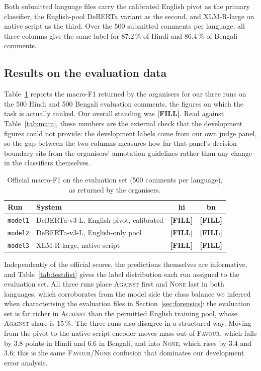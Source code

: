 \documentclass{ceurart}
\newcommand{\fillme}{\textbf{[FILL]}}
\newcommand{\offOneHi}{\fillme}   %
\newcommand{\offOneBn}{\fillme}   %
\newcommand{\offTwoHi}{\fillme}   %
\newcommand{\offTwoBn}{\fillme}   %
\newcommand{\offThreeHi}{\fillme} %
\newcommand{\offThreeBn}{\fillme} %
\newcommand{\offRank}{\fillme}
\begin{document}
Both submitted language files carry the calibrated English pivot as the
primary classifier, the English-pool DeBERTa variant as the second, and
XLM-R-large on native script as the third. Over the 500 submitted comments
per language, all three columns give the same label for $87.2\,\%$ of Hindi
and $86.4\,\%$ of Bengali comments.

\subsection{Results on the evaluation data}
\label{sec:official}

Table~\ref{tab:official} reports the macro-F1 returned by the organisers for
our three runs on the 500 Hindi and 500 Bengali evaluation comments, the
figures on which the task is actually ranked. Our overall standing was
\offRank. Read against Table~\ref{tab:main}, these numbers are the external
check that the development figures could not provide: the development labels
come from our own judge panel, so the gap between the two columns measures how
far that panel's decision boundary sits from the organisers' annotation
guidelines rather than any change in the classifiers themselves.

\begin{table}[t]
\centering
\caption{Official macro-F1 on the evaluation set (500 comments per language),
as returned by the organisers.}
\label{tab:official}
\begin{tabular}{llcc}
\toprule
Run & System & hi & bn \\
\midrule
\texttt{model1} & DeBERTa-v3-L, English pivot, calibrated & \offOneHi  & \offOneBn \\
\texttt{model2} & DeBERTa-v3-L, English-only pool         & \offTwoHi  & \offTwoBn \\
\texttt{model3} & XLM-R-large, native script              & \offThreeHi & \offThreeBn \\
\bottomrule
\end{tabular}
\end{table}

Independently of the official scores, the predictions themselves are
informative, and Table~\ref{tab:testdist} gives the label distribution each
run assigned to the evaluation set. All three runs place \textsc{Against}
first and \textsc{None} last in both languages, which corroborates from the
model side the class balance we inferred when characterising the evaluation
files in Section~\ref{sec:forensics}: the evaluation set is far richer in
\textsc{Against} than the permitted English training pool, whose
\textsc{Against} share is $15\,\%$. The three runs also disagree in a
structured way. Moving from the pivot to the native-script encoder moves mass
out of \textsc{Favour}, which falls by $3.8$ points in Hindi and $6.6$ in
Bengali, and into \textsc{None}, which rises by $3.4$ and $3.6$; this is the
same \textsc{Favour}/\textsc{None} confusion that dominates our development
error analysis.
\end{document}
